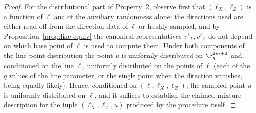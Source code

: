 \begin{proof}
	For the distributional part of Property~2, observe first that
	$(\ell_X, \ell_Z)$ is a function of $\ell$ and of the auxiliary
	randomness alone: the directions used are either read off from the
	direction data of $\ell$ or freshly sampled, and by
	Proposition~\ref{prop:line-equiv} the canonical representatives
	$v'_X, v'_Z$ do not depend on which base point of $\ell$ is used to
	compute them. Under both components of the line-point distribution the
	point $u$ is uniformly distributed on $\F_q^{2m+2}$ and, conditioned
	on the line $\ell$, uniformly distributed on the points of $\ell$
	(each of the $q$ values of the line parameter, or the single point
	when the direction vanishes, being equally likely). Hence, conditioned
	on $(\ell, \ell_X, \ell_Z)$, the sampled point $u$ is uniformly
	distributed on $\ell$, and it suffices to establish the claimed
	mixture description for the tuple $(\ell_X, \ell_Z, u)$ produced by
	the procedure itself.


\end{proof}
